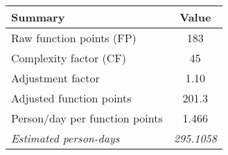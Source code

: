 \begin{tabular}{l|c}
\textbf{Summary} & \textbf{Value} \\ \hline
Raw function points (FP) & 183 \\
Complexity factor (CF) & 45 \\
Adjustment factor & 1.10 \\
Adjusted function points & 201.3 \\
Person/day per function points & 1.466 \\ \hline
\textit{Estimated person-days} & \textit{295.1058}
\end{tabular}
